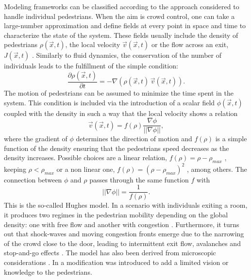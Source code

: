 Modeling frameworks can be classified according to the approach considered to handle individual pedestrians. When the aim is crowd control, one can take a large-number approximation and define fields at every point in space and time to characterize the state of the system. These fields usually include the density of pedestrians $\rho(\vec{x},t)$, the local velocity $\vec{v}(\vec{x},t)$ or the flow across an exit, $J(\vec{x},t)$ \cite{hughes_2002_continuum}. Similarly to fluid dynamics, the conservation of the number of individuals leads to the fulfillment of the simple condition:
\begin{equation}
\label{eq:ped:conv} 
\frac{\partial \rho(\vec{x},t) }{\partial t} = - \nabla (\rho(\vec{x},t) \, \vec{v}(\vec{x},t)). 
\end{equation}  
The motion of pedestrians can be assumed to minimize the time spent in the system. This condition is included via the introduction of a scalar field $\phi(\vec{x},t)$ coupled with the density in such a way that the local velocity shows a relation
\begin{equation}
\label{eq:ped:speed} 
\vec{v}(\vec{x},t) = f(\rho) \frac{\nabla \phi}{||\nabla \phi||},
\end{equation}
where the gradient of $\phi$ determines the direction of motion and $f(\rho)$ is a simple function of the density ensuring that the pedestrians speed decreases  as the density increases. Possible choices are a linear relation, $f(\rho) = \rho - \rho_{max}$ \cite{hughes_2002_continuum,helbing_2006_analytical}, keeping $\rho < \rho_{max}$ or a non linear one, $f(\rho) = (\rho - \rho_{max})^2$ \cite{carrillo_2015_local}, among others. The connection between $\phi$ and $\rho$ passes through the same function $f$ with
\begin{equation}
\label{eq:ped:phi} 
||\nabla \phi|| = \frac{1}{f(\rho)}.
\end{equation}
This is the so-called Hughes model. In a scenario with individuals exiting a room, it produces two regimes in the pedestrian mobility depending on the global density: one with free flow and another with congestion \cite{hughes_2002_continuum}. Furthermore, it turns out that shock-waves and moving congestion fronts emerge due to the narrowing of the crowd close to the door, leading to intermittent exit flow, avalanches and stop-and-go effects \cite{helbing_2006_analytical}. The model has also been derived from microscopic considerations \cite{carrillo_2015_local, corbetta_2015_asymmetric}. In \cite{carrillo_2015_local} a modification was introduced to add a limited vision or knowledge to the pedestrians. 


